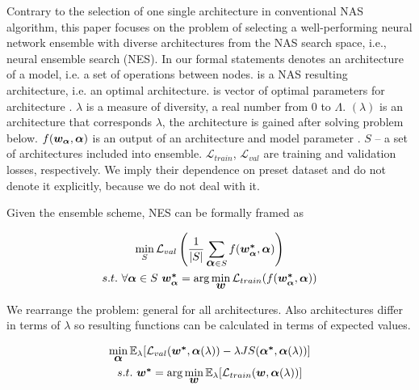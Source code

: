 \documentclass{article}
\begin{document}
Contrary to the selection of one single architecture in conventional NAS algorithm, this paper focuses on the problem of selecting a well-performing neural network ensemble with diverse architectures from the NAS search space, i.e., neural ensemble search (NES). In our formal statements
\mbox{\boldmath{$\alpha$}} denotes an architecture of a model, i.e. a set of operations between nodes. \mbox{\boldmath{$\alpha^*$}} is a NAS resulting architecture, i.e. an optimal architecture. \mbox{} is vector of optimal parameters for architecture \mbox{\boldmath{$\alpha^*$}}. $\lambda$ is a measure of diversity, a real number from $0$ to $\Lambda$. \mbox{\boldmath{$\alpha$}}$(\lambda)$ is an architecture that corresponds $\lambda$, the architecture is gained after solving problem below. $f(\mbox{\boldmath{$w_\alpha$}}, \mbox{\boldmath{$\alpha$}})$ is an output of an architecture \mbox{\boldmath{$\alpha$}} and model parameter \mbox{}. $S$ -- a set of architectures included into ensemble. $\mathcal{L}_{train}$, $\mathcal{L}_{val}$ are training and validation losses, respectively. We imply their dependence on preset dataset and do not denote it explicitly, because we do not deal with it.

Given the ensemble scheme, NES can be formally framed as

\begin{gather*}
	\min_S \mathcal{L}_{val}\left(\frac{1}{|S|}\sum_{\mbox{\boldmath{$\alpha$}} \in S}f(\mbox{\boldmath{$w_\alpha^*$}}, \mbox{\boldmath{$\alpha$}})\right) \\
s.t. \text{ }\forall \mbox{\boldmath{$\alpha$}} \in S \text{ } \mbox{\boldmath{$w_\alpha^*$}} = \arg \min_{\mbox{\boldmath{$w$}}} \mathcal{L}_{train}(f(\mbox{\boldmath{$w_\alpha^*$}}, \mbox{\boldmath{$\alpha$}}))
\end{gather*}

We rearrange the problem:  general for all architectures. Also architectures differ in terms of $\lambda$ so resulting functions can be calculated in terms of expected values.

\begin{gather*}
    \min_{\mbox{\boldmath{$\alpha$}}} \mathbb{E}_\lambda [\mathcal{L}_{val}(\mbox{\boldmath{$w^*$}}, \mbox{\boldmath{$\alpha$}}(\lambda)) - \lambda JS(\mbox{\boldmath{$\alpha^*$}}, \mbox{\boldmath{$\alpha$}}(\lambda))] \\
    s.t. \text{ } \mbox{\boldmath{$w^*$}} = \arg \min_{\mbox{\boldmath{$w$}}} \mathbb{E}_\lambda[\mathcal{L}_{train}(\mbox{\boldmath{$w$}}, \mbox{\boldmath{$\alpha$}}(\lambda))]
\end{gather*}
\end{document}
